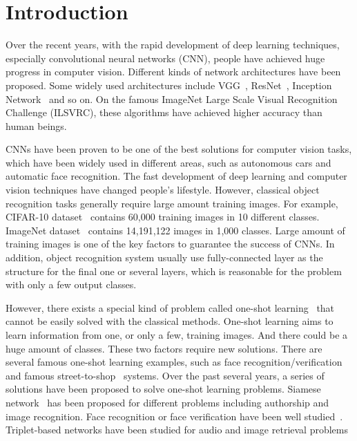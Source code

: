 \documentclass[final,3p]{elsarticle}
\begin{document}

\section{Introduction}
\label{S:introduction}

Over the recent years, with the rapid development of deep learning techniques, especially convolutional neural networks (CNN), people have achieved huge progress in computer vision. Different kinds of network architectures have been proposed. Some widely used architectures include VGG~\cite{simonyan2014very}, ResNet~\cite{he2016deep}, Inception Network~\cite{szegedy2016rethinking} and so on. On the famous ImageNet Large Scale Visual Recognition Challenge (ILSVRC), these algorithms have achieved higher accuracy than human beings. 

CNNs have been proven to be one of the best solutions for computer vision tasks, which have been widely used in different areas, such as autonomous cars and automatic face recognition. The fast development of deep learning and computer vision techniques have changed people's lifestyle. However, classical object recognition tasks generally require large amount training images. For example, CIFAR-10 dataset~\cite{krizhevsky2009learning} contains 60,000 training images in 10 different classes. ImageNet dataset~\cite{imagenet_cvpr09} contains 14,191,122 images in 1,000 classes. Large amount of training images is one of the key factors to guarantee the success of CNNs. In addition, object recognition system usually use fully-connected layer as the structure for the final one or several layers, which is reasonable for the problem with only a few output classes. 

However, there exists a special kind of problem called one-shot learning~\cite{fei2006one} that cannot be easily solved with the classical methods. One-shot learning aims to learn information from one, or only a few, training images. And there could be a huge amount of classes. These two factors require new solutions. There are several famous one-shot learning examples, such as face recognition/verification and famous street-to-shop~\cite{liu2012street} systems. Over the past several years, a series of solutions have been proposed to solve one-shot learning problems. Siamese network~\cite{koch2015siamese} has been proposed for different problems including authorship and image recognition. Face recognition or face verification have been well studied~\cite{schroff2015facenet, liu2015targeting}. Triplet-based networks have been studied for audio and image retrieval problems~\cite{wang2014learning, lin2015rapid, kiapour2015buy, wang2016matching, shankar2017deep, qi2017audio}
\end{document}
